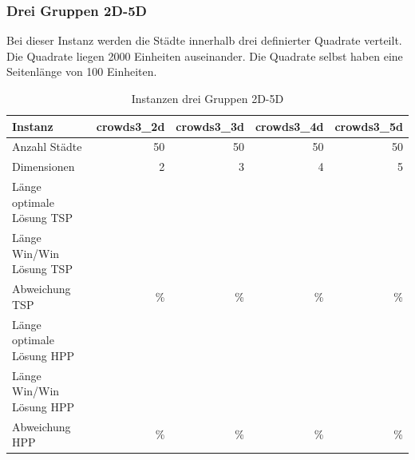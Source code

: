 \documentclass[11pt,a4paper]{article}
\begin{document}
\subsubsection{Drei Gruppen 2D-5D}
Bei dieser Instanz werden die Städte innerhalb drei definierter Quadrate verteilt. Die Quadrate liegen 2000 Einheiten auseinander. Die Quadrate selbst haben eine Seitenlänge von 100 Einheiten.

\begin{table}[H]
        \centering
        \begin{tabular}{| l | r | r | r | r |}
            \hline
            Instanz                     & \textbf{crowds3\_2d}     
                                        & \textbf{crowds3\_3d}     
                                        & \textbf{crowds3\_4d}     
                                        & \textbf{crowds3\_5d}             \\ \hline
                Anzahl Städte               & 50        & 50       & 50         & 50        \\ \hline
                Dimensionen                 & 2         & 3        & 4          & 5         \\ \hline
                Länge optimale Lösung TSP   &           &          &            &           \\ \hline
                Länge Win/Win Lösung  TSP   &           &          &            &           \\ \hline
                Abweichung TSP              &     \%    &      \%  &      \%    &      \%   \\ \hline
                Länge optimale Lösung HPP   &           &          &            &           \\ \hline
                Länge Win/Win Lösung  HPP   &           &          &            &           \\ \hline
                Abweichung HPP              &     \%    &     \%   &     \%     &      \%   \\ \hline
        \end{tabular}
        \caption{Instanzen drei Gruppen 2D-5D}
        \label{tab:instanzen_crowds3}
\end{table}
\end{document}
